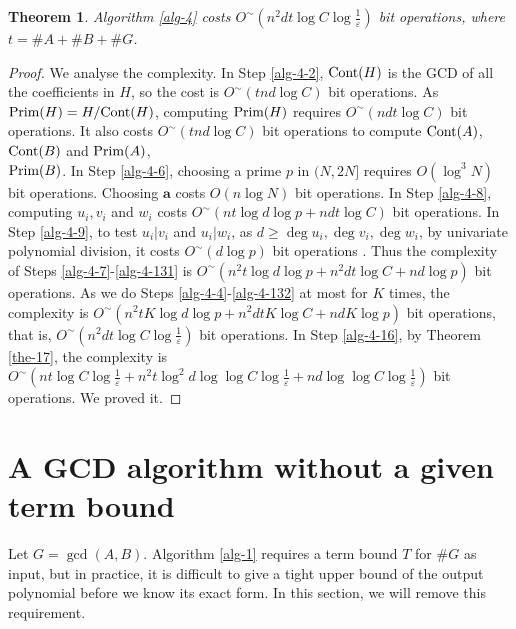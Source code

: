 \documentclass[final,20pt]{elsarticle}
\newtheorem{theorem}{Theorem}[section]
\def\Cont{\hbox{\rm{Cont}}}
\def\Prim{\hbox{\rm{Prim}}}
\begin{document}
\begin{theorem}\label{the-6}
Algorithm \ref{alg-4} costs $O^\sim(n^2dt\log C\log \frac{1}{\varepsilon})$ bit operations, where $t=\#A+\#B+\#G$.
\end{theorem}
\begin{proof}
We analyse the complexity.
In Step \ref{alg-4-2}, $\Cont(H)$ is the GCD of all the coefficients in $H$, so the cost is $O^\sim(tnd\log C)$ bit operations. As $\Prim(H)=H/\Cont(H)$, computing $\Prim(H)$ requires $O^\sim(ndt\log C)$ bit operations.
%
It also costs $O^\sim(tnd\log C)$ bit operations to compute $\Cont(A)$,$\Cont(B)$ and $\Prim(A)$,\\$\Prim(B)$.
%
In Step \ref{alg-4-6}, choosing a prime $p$ in $(N,2N]$ requires $O(\log^3N)$ bit operations. Choosing $\mathbf{a}$ costs $O(n\log N)$ bit operations.
%
In Step \ref{alg-4-8}, computing $u_i,v_i$ and $w_i$ costs $O^\sim(nt\log d\log p+ndt\log C)$
bit operations. In Step \ref{alg-4-9}, to test $u_i|v_i$ and $u_i|w_i$, as $d\geq \deg u_i,\deg v_i,\deg w_i$, by univariate polynomial division, it costs $O^\sim(d\log p)$ bit operations \cite[p23]{Bini1994Polynomial}. Thus the complexity of Steps \ref{alg-4-7}-\ref{alg-4-131} is $O^\sim(n^2t\log d\log p+n^2dt\log C+nd\log p)$ bit operations.
%
As we do Steps \ref{alg-4-4}-\ref{alg-4-132} at most for $K$ times, the complexity is $O^\sim(n^2tK\log d\log p+n^2dtK\log C+ndK\log p)$ bit operations, that  is, $O^\sim(n^2dt\log C\log \frac{1}{\varepsilon})$ bit operations.
%
In Step \ref{alg-4-16}, by Theorem \ref{the-17}, the complexity is $O^\sim(nt\log C\log \frac{1}{\varepsilon}+n^2t\log^2 d\log\log C\log\frac{1}{\varepsilon}+nd\log\log C\log\frac{1}{\varepsilon})$ bit operations.
We proved it.
\end{proof}

\section{A GCD algorithm without a given term bound}
Let $G=\gcd(A,B)$.  Algorithm \ref{alg-1} requires a term bound $T$ for $\#G$ as input, but in practice, it is difficult to give a tight upper bound of the output polynomial before we know its exact form. In this section, we will remove this requirement.
\end{document}
